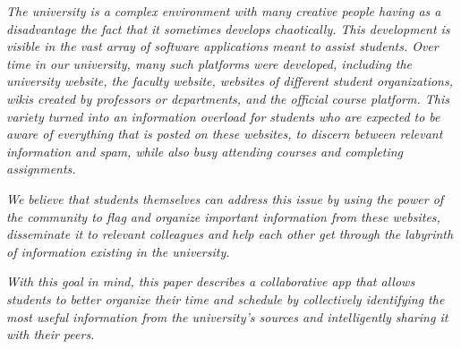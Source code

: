 \vspace*{\fill}
\noindent

\textit{The university is a complex environment with many creative people having as a disadvantage the fact that it sometimes develops chaotically. This development is visible in the vast array of software applications meant to assist students. Over time in our university, many such platforms were developed, including the university website, the faculty website, websites of different student organizations, wikis created by professors or departments, and the official course platform. This variety turned into an information overload for students who are expected to be aware of everything that is posted on these websites, to discern between relevant information and spam, while also busy attending courses and completing assignments.}

\textit{We believe that students themselves can address this issue by using the power of the community to flag and organize important information from these websites, disseminate it to relevant colleagues and help each other get through the labyrinth of information existing in the university.}

\textit{With this goal in mind, this paper describes a collaborative app that allows students to better organize their time and schedule by collectively identifying the most useful information from the university's sources and intelligently sharing it with their peers.}

\vspace*{\fill}